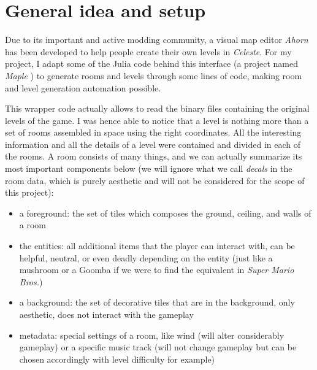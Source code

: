 \documentclass{article}
\newcommand{\Celnosp}{\textit{Celeste}}
\begin{document}
\section{General idea and setup}
Due to its important and active modding community, a visual map editor \textit{Ahorn} has been developed to help people create their own levels in \Celnosp. For my project, I adapt some of the Julia code behind this interface (a project named \textit{Maple} \cite{maple}) to generate rooms and levels through some lines of code, making room and level generation automation possible.

\noindent This wrapper code actually allows to read the binary files containing the original levels of the game. I was hence able to notice that a level is nothing more than a set of rooms assembled in space using the right coordinates. All the interesting information and all the details of a level were contained and divided in each of the rooms. A room consists of many things, and we can actually summarize its most important components below (we will ignore what we call \textit{decals} in the room data, which is purely aesthetic and will not be considered for the scope of this project):
\begin{itemize}
    \item a foreground: the set of tiles which composes the ground, ceiling, and walls of a room
    \item the entities: all additional items that the player can interact with, can be helpful, neutral, or even deadly depending on the entity (just like a mushroom or a Goomba if we were to find the equivalent in \textit{Super Mario Bros.})
    \item a background: the set of decorative tiles that are in the background, only aesthetic, does not interact with the gameplay
    \item metadata: special settings of a room, like wind (will alter considerably gameplay) or a specific music track (will not change gameplay but can be chosen accordingly with level difficulty for example)
\end{itemize}
\end{document}
